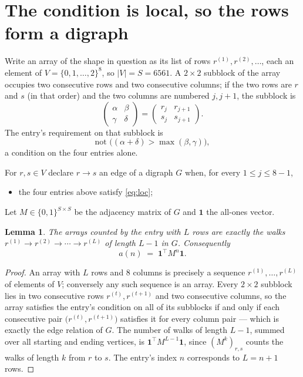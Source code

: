 \documentclass[11pt,a4paper]{article}
\theoremstyle{plain}
\newtheorem{lemma}[theorem]{Lemma}
\theoremstyle{definition}
\begin{document}
\section{The condition is local, so the rows form a digraph}

Write an array of the shape in question as its list of rows
$r^{(1)},r^{(2)},\dots$, each an element of
$V=\{0,1,\dots,2\}^{8}$, so $|V|=S=6561$. A $2\times2$ subblock of the array
occupies two consecutive rows and two consecutive columns; if the two rows are $r$
and $s$ (in that order) and the two columns are numbered $j,j+1$,
the subblock is
\[
\begin{pmatrix}\alpha&\beta\\\gamma&\delta\end{pmatrix}=\begin{pmatrix}r_j&r_{j+1}\\s_j&s_{j+1}\end{pmatrix}.
\]
The entry's requirement on that subblock is
\begin{equation}\label{eq:loc}
\text{not }\bigl((\alpha+\delta)>\max(\beta,\gamma)\bigr),
\end{equation}
a condition on the four entries alone.

For $r,s\in V$ declare $r\to s$ an edge of a digraph $G$ when, for every
$1\le j\le 8-1$,
\begin{itemize}
\item the four entries above satisfy \eqref{eq:loc};

\end{itemize}
Let $M\in\{0,1\}^{S\times S}$ be the adjacency matrix of $G$ and $\mathbf{1}$ the
all-ones vector.

\begin{lemma}\label{lem:walk}
The arrays counted by the entry with $L$ rows are exactly the walks
$r^{(1)}\to r^{(2)}\to\cdots\to r^{(L)}$ of length $L-1$ in $G$. Consequently
\[
a(n)\;=\;\mathbf{1}^{\!\top}M^{n}\mathbf{1} .
\]
\end{lemma}

\begin{proof}
An array with $L$ rows and $8$ columns is precisely a sequence
$r^{(1)},\dots,r^{(L)}$ of elements of $V$; conversely any such sequence is an array.
Every $2\times2$ subblock lies in two consecutive rows $r^{(t)},r^{(t+1)}$ and two
consecutive columns, so the array satisfies the entry's condition on all of its subblocks
if and only if each consecutive pair $\bigl(r^{(t)},r^{(t+1)}\bigr)$ satisfies it for
every column pair --- which is exactly the edge relation of $G$. The number of walks of
length $L-1$, summed over all starting and ending vertices, is
$\mathbf{1}^{\!\top}M^{L-1}\mathbf{1}$, since $(M^{k})_{r,s}$ counts the walks of
length $k$ from $r$ to $s$. The entry's index $n$ corresponds to $L=n+1$ rows.
\end{proof}
\end{document}
